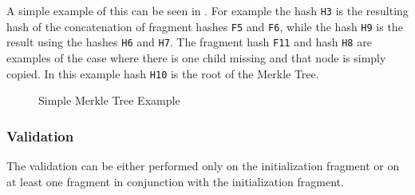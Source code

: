 A simple example of this can be seen in . For example the hash \texttt{H3} is the resulting hash of the concatenation of fragment hashes \texttt{F5} and \texttt{F6}, while the hash \texttt{H9} is the result using the hashes \texttt{H6} and \texttt{H7}. The fragment hash \texttt{F11} and hash \texttt{H8} are examples of the case where there is one child missing and that node is simply copied. In this example hash \texttt{H10} is the root of the Merkle Tree.

\begin{figure}
    \centering
    \caption{Simple Merkle Tree Example}
    \label{fig:merkle_example}
\end{figure}

\subsubsection{Validation}

The validation can be either performed only on the initialization fragment or on at least one fragment in conjunction with the initialization fragment.

